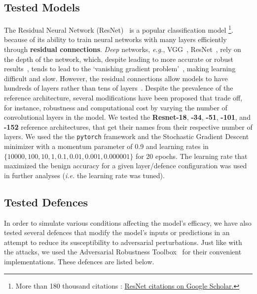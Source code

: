 \subsection{Tested Models}
\label{models}
The Residual Neural Network (ResNet)~\citep{resnet} is a popular classification model \footnote{More than 180 thousand citations : \href{https://scholar.google.com/scholar?cites=9281510746729853742}{ResNet citations on Google Scholar.}}. because of its ability to train neural networks with many layers efficiently through \textbf{residual connections}.
\textit{Deep} networks, \textit{e.g.}, VGG~\citep{vgg}, ResNet~\citep{resnet}, rely on the depth of the network, which, despite leading to more accurate or robust results~\citep{rolnick2017power, carlini_towards_2017}, tends to lead to the `vanishing gradient problem'~\citep{hochreiter1998vanishing}, making learning difficult and slow. However, the residual connections allow models to have hundreds of layers rather than tens of layers~\citep{resnet,vgg}. Despite the prevalence of the reference architecture, several modifications have been proposed that trade off, for instance, robustness and computational cost by varying the number of convolutional layers in the model. We tested the \textbf{Resnet-18}, \textbf{-34}, \textbf{-51}, \textbf{-101}, and \textbf{-152} reference architectures, that get their names from their respective number of layers. We used the the \texttt{pytorch} framework and the Stochastic Gradient Descent minimizer with a momentum parameter of 0.9 and learning rates in $\{10000, 100, 10, 1, 0.1, 0.01, 0.001, 0.000001\}$ for 20 epochs. The learning rate that maximized the benign accuracy for a given layer/defence configuration was used in further analyses (\textit{i.e.} the learning rate was tuned).

\subsection{Tested Defences}
\label{defences}
In order to simulate various conditions affecting the model's efficacy, we have also tested several defences that modify the model's inputs or predictions in an attempt to reduce its susceptibility to adversarial perturbations. Just like with the attacks, we used the Adversarial Robustness Toolbox~\citep{art2018} for their convenient implementations. These defences are listed below.


